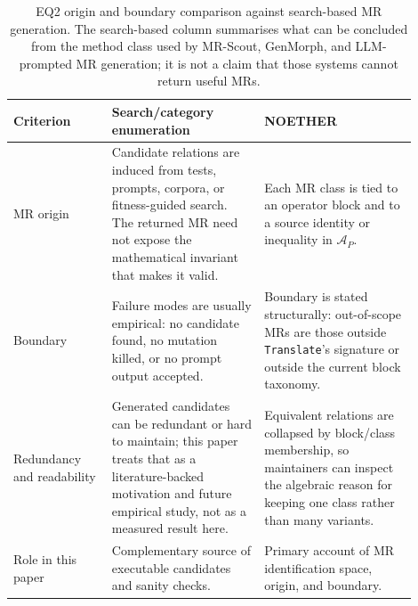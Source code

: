 \documentclass[manuscript]{acmart}
\begin{document}
\begin{table}[h]
\centering
\caption{EQ2 origin and boundary comparison against search-based MR generation.
The search-based column summarises what can be concluded from the method class
used by MR-Scout, GenMorph, and LLM-prompted MR generation; it is not a claim
that those systems cannot return useful MRs.}
\label{tab:search-origin-boundary}
\small
\begin{tabular}{p{0.22\linewidth}p{0.34\linewidth}p{0.34\linewidth}}
\toprule
Criterion & Search/category enumeration & NOETHER \\
\midrule
MR origin & Candidate relations are induced from tests, prompts, corpora, or
fitness-guided search. The returned MR need not expose the mathematical
invariant that makes it valid. & Each MR class is tied to an operator block and
to a source identity or inequality in $\mathcal{A}_P$. \\
Boundary & Failure modes are usually empirical: no candidate found, no mutation
killed, or no prompt output accepted. & Boundary is stated structurally:
out-of-scope MRs are those outside \texttt{Translate}'s signature or outside the
current block taxonomy. \\
Redundancy and readability & Generated candidates can be redundant or hard to
maintain; this paper treats that as a literature-backed motivation and future
empirical study, not as a measured result here. & Equivalent relations are
collapsed by block/class membership, so maintainers can inspect the algebraic
reason for keeping one class rather than many variants. \\
Role in this paper & Complementary source of executable candidates and sanity
checks. & Primary account of MR identification space, origin, and boundary. \\
\bottomrule
\end{tabular}
\end{table}
\end{document}
